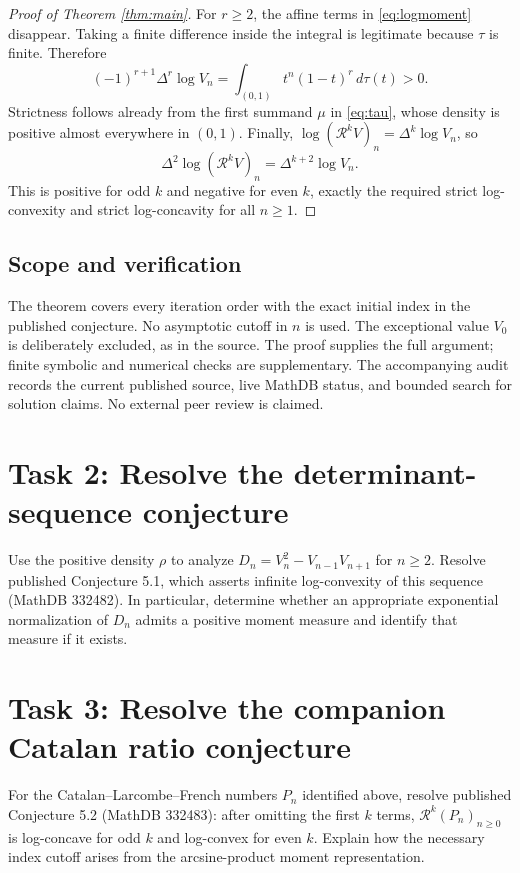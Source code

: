 \documentclass[11pt]{article}
\begin{document}
\begin{proof}[Proof of Theorem \ref{thm:main}]
For $r\geq2$, the affine terms in \eqref{eq:logmoment} disappear.
Taking a finite difference inside the integral is legitimate because
$\tau$ is finite. Therefore
\[
 (-1)^{r+1}\Delta^r\log V_n
   =\int_{(0,1)}t^n(1-t)^r\,d\tau(t)>0.
\]
Strictness follows already from the first summand $\mu$ in
\eqref{eq:tau}, whose density is positive almost everywhere in $(0,1)$.
Finally, $\log(\mathcal R^kV)_n=\Delta^k\log V_n$, so
\[
 \Delta^2\log(\mathcal R^kV)_n=\Delta^{k+2}\log V_n.
\]
This is positive for odd $k$ and negative for even $k$, exactly the
required strict log-convexity and strict log-concavity for all $n\geq1$.
\end{proof}

\subsection*{Scope and verification}
The theorem covers every iteration order with the exact initial index
in the published conjecture. No asymptotic cutoff in $n$ is used.
The exceptional value $V_0$ is deliberately excluded, as in the source.
The proof supplies the full argument; finite symbolic and numerical
checks are supplementary. The accompanying audit records the current
published source, live MathDB status, and bounded search for solution
claims. No external peer review is claimed.

\section*{Task 2: Resolve the determinant-sequence conjecture}
Use the positive density $\rho$ to analyze
$D_n=V_n^2-V_{n-1}V_{n+1}$ for $n\geq2$.
Resolve published Conjecture 5.1, which asserts infinite log-convexity
of this sequence (MathDB 332482). In particular, determine whether
an appropriate exponential normalization of $D_n$ admits a positive
moment measure and identify that measure if it exists.

\section*{Task 3: Resolve the companion Catalan ratio conjecture}
For the Catalan--Larcombe--French numbers $P_n$ identified above,
resolve published Conjecture 5.2 (MathDB 332483): after omitting the
first $k$ terms, $\mathcal R^k(P_n)_{n\geq0}$ is log-concave for odd
$k$ and log-convex for even $k$. Explain how the necessary index cutoff
arises from the arcsine-product moment representation.
\end{document}
